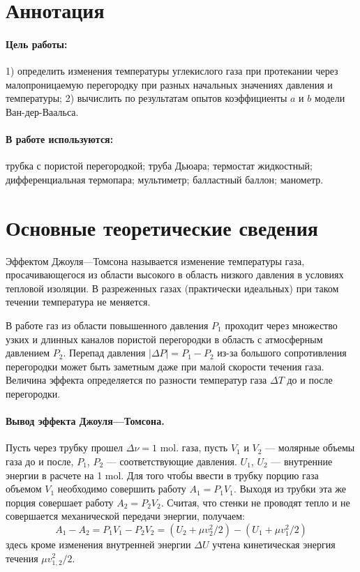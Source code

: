 \documentclass[a4paper,12pt]{report}
\begin{document}
	
	\newpage
    
    \section*{Аннотация}
        \paragraph*{Цель работы:} 1) определить изменения температуры углекислого газа при протекании через малопроницаемую перегородку при разных начальных значениях давления и температуры; 2) вычислить по результатам опытов коэффициенты $a$ и $b$ модели Ван-дер-Ваальса.
        \paragraph*{В работе используются:} трубка с пористой перегородкой; труба Дьюара; термостат жидкостный; дифференциальная термопара; мультиметр; балластный баллон; манометр.

    \section*{Основные теоретические сведения}
        Эффектом Джоуля---Томсона называется изменение температуры газа, просачивающегося из области высокого в область низкого давления в условиях тепловой изоляции. В разреженных газах (практически идеальных) при таком течении температура не меняется.

        В работе газ из области повышенного давления $P_1$ проходит через множество узких и длинных каналов пористой перегородки в область с атмосферным давлением $P_2$. Перепад давления $|\Delta P|=P_1-P_2$ из-за большого сопротивления перегородки может быть заметным даже при малой скорости течения газа. Величина эффекта определяется по разности температур газа $\Delta T$ до и после перегородки.

        \paragraph*{Вывод эффекта Джоуля---Томсона.} Пусть через трубку прошел $\Delta \nu = 1$ mol. газа, пусть $V_1$ и $V_2$ --- молярные объемы газа до и после, $P_1$, $P_2$ --- соответствующие давления. $U_1$, $U_2$ --- внутренние энергии в расчете на 1 mol. Для того чтобы ввести в трубку порцию газа объемом $V_1$ необходимо совершить работу $A_1=P_1V_1$. Выходя из трубки эта же порция совершает работу $A_2=P_2V_2$. Считая, что стенки не проводят тепло и не совершается механической передачи энергии, получаем:
        \begin{equation}
            A_1-A_2=P_1V_1-P_2V_2=(U_2+\mu v_2^2/2)-(U_1+\mu v_1^2/2)
            \label{dA}
        \end{equation}
        здесь кроме изменения внутренней энергии $\Delta U$ учтена кинетическая энергия течения $\mu v_{1,2}^2/2$.
\end{document}
